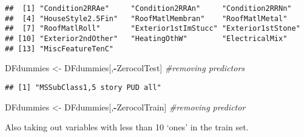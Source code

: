 \documentclass[]{article}
\newenvironment{Shaded}{\begin{snugshade}}{\end{snugshade}}
\newcommand{\KeywordTok}[1]{\textcolor[rgb]{0.13,0.29,0.53}{\textbf{#1}}}
\newcommand{\DecValTok}[1]{\textcolor[rgb]{0.00,0.00,0.81}{#1}}
\newcommand{\StringTok}[1]{\textcolor[rgb]{0.31,0.60,0.02}{#1}}
\newcommand{\CommentTok}[1]{\textcolor[rgb]{0.56,0.35,0.01}{\textit{#1}}}
\newcommand{\OperatorTok}[1]{\textcolor[rgb]{0.81,0.36,0.00}{\textbf{#1}}}
\newcommand{\NormalTok}[1]{#1}
\begin{document}
\begin{verbatim}
##  [1] "Condition2RRAe"     "Condition2RRAn"     "Condition2RRNn"    
##  [4] "HouseStyle2.5Fin"   "RoofMatlMembran"    "RoofMatlMetal"     
##  [7] "RoofMatlRoll"       "Exterior1stImStucc" "Exterior1stStone"  
## [10] "Exterior2ndOther"   "HeatingOthW"        "ElectricalMix"     
## [13] "MiscFeatureTenC"
\end{verbatim}

\begin{Shaded}
\begin{Highlighting}[]
\NormalTok{DFdummies <-}\StringTok{ }\NormalTok{DFdummies[,}\OperatorTok{-}\NormalTok{ZerocolTest] }\CommentTok{#removing predictors}
\end{Highlighting}
\end{Shaded}

\begin{Shaded}
\end{Shaded}

\begin{verbatim}
## [1] "MSSubClass1,5 story PUD all"
\end{verbatim}

\begin{Shaded}
\begin{Highlighting}[]
\NormalTok{DFdummies <-}\StringTok{ }\NormalTok{DFdummies[,}\OperatorTok{-}\NormalTok{ZerocolTrain] }\CommentTok{#removing predictor}
\end{Highlighting}
\end{Shaded}

Also taking out variables with less than 10 `ones' in the train set.

\begin{Shaded}
\end{Shaded}
\end{document}
